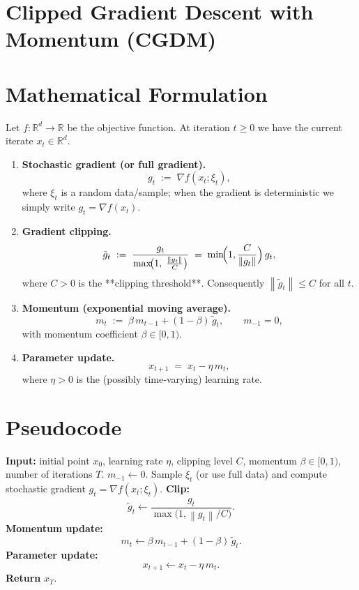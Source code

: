 \documentclass{article}
\newcommand{\norm}[1]{\left\|#1\right\|}
\newcommand{\grad}{\nabla}
\begin{document}
\section*{Clipped Gradient Descent with Momentum (CGDM)}

\section*{Mathematical Formulation}
Let $f:\mathbb{R}^{d}\rightarrow\mathbb{R}$ be the objective function.  
At iteration $t\ge 0$ we have the current iterate $x_t\in\mathbb{R}^{d}$.
\begin{enumerate}[label=\arabic*)]
    \item \textbf{Stochastic gradient (or full gradient).}
    \[
        g_t \;:=\; \grad f(x_t; \xi_t),
    \]
    where $\xi_t$ is a random data/sample; when the gradient is deterministic we simply write $g_t=\grad f(x_t)$.
    \item \textbf{Gradient clipping.}
    \[
        \tilde g_t \;:=\; \frac{g_t}{\max\!\bigl(1,\; \frac{\norm{g_t}}{C}\bigr)}
        \;=\; \min\!\Bigl(1,\frac{C}{\norm{g_t}}\Bigr)\,g_t,
    \]
    where $C>0$ is the **clipping threshold**. Consequently $\norm{\tilde g_t}\le C$ for all $t$.
    \item \textbf{Momentum (exponential moving average).}
    \[
        m_t \;:=\; \beta\,m_{t-1}+(1-\beta)\,\tilde g_t,
        \qquad m_{-1}=0,
    \]
    with momentum coefficient $\beta\in[0,1)$.
    \item \textbf{Parameter update.}
    \[
        x_{t+1}\;=\;x_t-\eta\,m_t,
    \]
    where $\eta>0$ is the (possibly time‑varying) learning rate.
\end{enumerate}

\section*{Pseudocode}
\begin{algorithm}[H]
\caption{Clipped Gradient Descent with Momentum}
\begin{algorithmic}[1]
\STATE \textbf{Input:} initial point $x_0$, learning rate $\eta$, clipping level $C$, momentum $\beta\in[0,1)$, number of iterations $T$.
\STATE $m_{-1}\gets 0$.
    \STATE Sample $\xi_t$ (or use full data) and compute stochastic gradient $g_t = \grad f(x_t;\xi_t)$.
    \STATE \textbf{Clip:}\;
    \[
        \tilde g_t \gets \frac{g_t}{\max\!\bigl(1,\norm{g_t}/C\bigr)}.
    \]
    \STATE \textbf{Momentum update:}\;
    \[
        m_t \gets \beta\,m_{t-1}+(1-\beta)\,\tilde g_t.
    \]
    \STATE \textbf{Parameter update:}\;
    \[
        x_{t+1}\gets x_t-\eta\,m_t.
    \]
\ENDFOR
\STATE \textbf{Return} $x_T$.
\end{algorithmic}
\end{algorithm}
\end{document}

